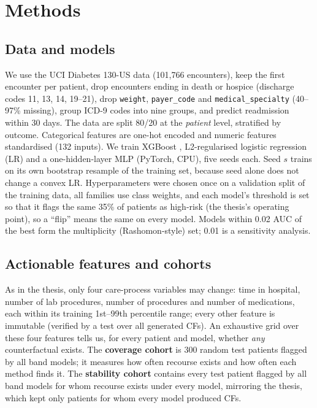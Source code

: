 \documentclass[conference]{IEEEtran}
\begin{document}
\section{Methods}
\subsection{Data and models}
We use the UCI Diabetes 130-US data \cite{strack2014} (101,766 encounters), keep the first encounter per patient, drop
encounters ending in death or hospice (discharge codes 11, 13, 14, 19--21), drop \texttt{weight},
\texttt{payer\_code} and \texttt{medical\_specialty} (40--97\% missing), group ICD-9 codes into nine groups, and predict
readmission within 30 days. The data are split 80/20 at the \emph{patient} level, stratified by outcome. Categorical
features are one-hot encoded and numeric features standardised (132 inputs).
We train XGBoost \cite{chen2016xgboost}, L2-regularised logistic regression (LR) and a one-hidden-layer MLP (PyTorch, CPU),
five seeds each. Seed $s$ trains on its own bootstrap resample of the training set, because seed alone does not change a
convex LR. Hyperparameters were chosen once on a validation split of the training data, all families use class
weights, and each model's threshold is set so that it flags the same 35\% of patients as high-risk (the thesis's
operating point), so a ``flip'' means the same on every model. Models within 0.02 AUC of the best form the
multiplicity (Rashomon-style) set; 0.01 is a sensitivity analysis.

\subsection{Actionable features and cohorts}
As in the thesis, only four care-process variables may change: time in hospital, number of lab procedures, number of
procedures and number of medications, each within its training 1st--99th percentile range; every other feature is
immutable (verified by a test over all generated CFs). An exhaustive grid over these four features tells us, for every
patient and model, whether \emph{any} counterfactual exists. The \textbf{coverage cohort} is 300 random test patients
flagged by all band models; it measures how often recourse exists and how often each method finds it. The
\textbf{stability cohort} contains every test patient flagged by all band models for whom recourse exists under every
model, mirroring the thesis, which kept only patients for whom every model produced CFs.
\end{document}

